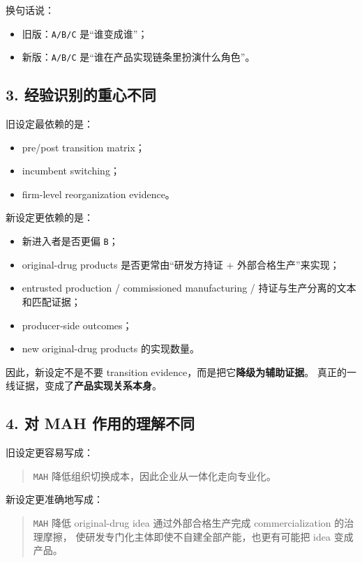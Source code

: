 \documentclass[12pt]{ctexart}
\begin{document}
换句话说：

\begin{itemize}[leftmargin=2em]
    \item 旧版：\texttt{A/B/C} 是“谁变成谁”；
    \item 新版：\texttt{A/B/C} 是“谁在产品实现链条里扮演什么角色”。
\end{itemize}

\subsection*{3. 经验识别的重心不同}

旧设定最依赖的是：

\begin{itemize}[leftmargin=2em]
    \item pre/post transition matrix；
    \item incumbent switching；
    \item firm-level reorganization evidence。
\end{itemize}

新设定更依赖的是：

\begin{itemize}[leftmargin=2em]
    \item 新进入者是否更偏 \texttt{B}；
    \item original-drug products 是否更常由“研发方持证 + 外部合格生产”来实现；
    \item entrusted production / commissioned manufacturing / 持证与生产分离的文本和匹配证据；
    \item producer-side outcomes；
    \item new original-drug products 的实现数量。
\end{itemize}

因此，新设定不是不要 transition evidence，而是把它\textbf{降级为辅助证据}。
真正的一线证据，变成了\textbf{产品实现关系本身}。

\subsection*{4. 对 MAH 作用的理解不同}

旧设定更容易写成：

\begin{quote}
\texttt{MAH} 降低组织切换成本，因此企业从一体化走向专业化。
\end{quote}

新设定更准确地写成：

\begin{quote}
\texttt{MAH} 降低 original-drug idea 通过外部合格生产完成 commercialization 的治理摩擦，
使研发专门化主体即使不自建全部产能，也更有可能把 idea 变成产品。
\end{quote}
\end{document}
